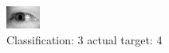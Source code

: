 \begin{figure}[h!]
\begin{center}
\includegraphics[width=0.60\columnwidth]{figures/ID3174_class_3_target_4.png}
\end{center}
\caption{ Classification: 3 actual target: 4}
\label{fig:ID3174_class_3_target_4}
\end{figure}
